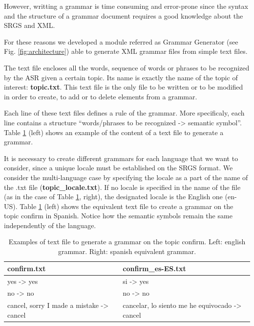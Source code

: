 \documentclass[11pt,a4paper]{article}
\begin{document}
However, writting a grammar is time consuming and error-prone since the syntax and the structure of a grammar document requires a good knowledge about the SRGS and XML.

For these reasons we developed a module referred as Grammar Generator (see Fig. \ref{fig:architecture}) able to generate XML grammar files from simple text files.

The text file encloses all the words, sequence of words or phrases to be recognized
by the ASR given a certain topic. Its name is exactly the name of the topic of interest: \textbf{topic.txt}.
This text file is the only file to be written or to be modified in order to create, to
add or to delete elements from a grammar.

Each line of these text files defines a rule of the grammar. More specificaly, each line contains a structure ``{\ttfamily words/phrases to be recognized -> semantic symbol}''.
Table \ref{tab:grammarFileExample} (left) shows an example of the content of a text file to generate a grammar.

It is necessary to create different grammars for each language that we want to consider, since a unique locale must be established on the SRGS format. 
We consider the multi-language case by specifying the locale as a part of the name of the .txt file (\textbf{topic\_locale.txt}). If no locale is specified in the name of the file (as in the case of Table \ref{tab:grammarFileExample}, right), the designated locale is the English one (en-US).  
Table \ref{tab:grammarFileExample} (left) shows the equivalent text file to create a grammar on the topic confirm in Spanish. Notice how the semantic symbols remain the same independently of the language.

\begin{table}[h]
{\ttfamily
\begin{center}
  \begin{tabular}{|l|l|}
    \hline
\bf{confirm.txt} & \bf{confirm\_es-ES.txt} \\
    \hline
yes -> yes  & si -> yes\\
no  -> no   & no -> no\\
cancel, sorry I made a mistake -> cancel & cancelar, lo siento me he equivocado -> cancel \\
    \hline
  \end{tabular}
\end{center}
}
    \caption{Examples of text file to generate a grammar on the topic confirm. Left: english grammar. Right: spanish equivalent grammar.}
    \label{tab:grammarFileExample}   
\end{table}
\end{document}

